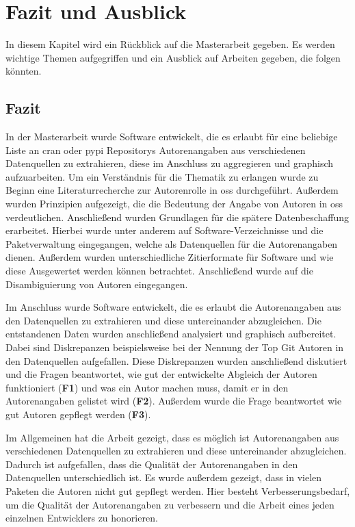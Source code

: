 \chapter{Fazit und Ausblick}
\label{cap:fazit_ausblick}
In diesem Kapitel wird ein Rückblick auf die Masterarbeit gegeben. Es werden wichtige Themen aufgegriffen und ein Ausblick auf Arbeiten gegeben, die folgen könnten.

\section{Fazit}
\label{sec:fazit}
In der Masterarbeit wurde Software entwickelt, die es erlaubt für eine beliebige Liste an \gls{cran} oder \gls{pypi} Repositorys Autorenangaben aus verschiedenen Datenquellen zu extrahieren, diese im Anschluss zu aggregieren und graphisch aufzuarbeiten.
Um ein Verständnis für die Thematik zu erlangen wurde zu Beginn eine Literaturrecherche zur Autorenrolle in \gls{oss} durchgeführt.
Außerdem wurden Prinzipien aufgezeigt, die die Bedeutung der Angabe von Autoren in \gls{oss} verdeutlichen.
Anschließend wurden Grundlagen für die spätere Datenbeschaffung erarbeitet.
Hierbei wurde unter anderem auf Software-Verzeichnisse und die Paketverwaltung eingegangen, welche als Datenquellen für die Autorenangaben dienen.
Außerdem wurden unterschiedliche Zitierformate für Software und wie diese Ausgewertet werden können betrachtet.
Anschließend wurde auf die Disambiguierung von Autoren eingegangen.

Im Anschluss wurde Software entwickelt, die es erlaubt die Autorenangaben aus den Datenquellen zu extrahieren und diese untereinander abzugleichen.
Die entstandenen Daten wurden anschließend analysiert und graphisch aufbereitet.
Dabei sind Diskrepanzen beispielsweise bei der Nennung der Top Git Autoren in den Datenquellen aufgefallen.
Diese Diskrepanzen wurden anschließend diskutiert und die Fragen beantwortet, wie gut der entwickelte Abgleich der Autoren funktioniert (\textbf{F1}) und was ein Autor machen muss, damit er in den Autorenangaben gelistet wird (\textbf{F2}).
Außerdem wurde die Frage beantwortet wie gut Autoren gepflegt werden (\textbf{F3}).

Im Allgemeinen hat die Arbeit gezeigt, dass es möglich ist Autorenangaben aus verschiedenen Datenquellen zu extrahieren und diese untereinander abzugleichen.
Dadurch ist aufgefallen, dass die Qualität der Autorenangaben in den Datenquellen unterschiedlich ist.
Es wurde außerdem gezeigt, dass in vielen Paketen die Autoren nicht gut gepflegt werden.
Hier besteht Verbesserungsbedarf, um die Qualität der Autorenangaben zu verbessern und die Arbeit eines jeden einzelnen Entwicklers zu honorieren.

